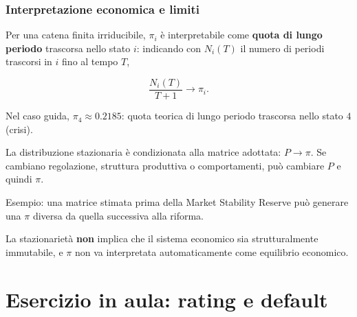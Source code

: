 \begin{frame}%
%

\frametitle{Interpretazione economica e limiti}%
%

%


Per una catena finita irriducibile, $\pi_{i}$ \`{e} interpretabile come
\textbf{quota di lungo periodo} trascorsa nello stato $i$: indicando con
$N_{i}(T)$ il numero di periodi trascorsi in $i$ fino al tempo $T$,%

\[
\frac{N_{i}(T)}{T+1} \longrightarrow\pi_{i}.
\]


Nel caso guida, $\pi_{4}\approx0.2185$: quota teorica di lungo periodo
trascorsa nello stato $4$ (crisi).

\medskip

\begin{stepitemize}
\item La distribuzione stazionaria \`{e} condizionata alla matrice adottata:
$P\longrightarrow\pi$. Se cambiano regolazione, struttura produttiva o
comportamenti, pu\`{o} cambiare $P$ e quindi $\pi$.

\item Esempio: una matrice stimata prima della Market Stability Reserve
pu\`{o} generare una $\pi$ diversa da quella successiva alla riforma.

\item La stazionariet\`{a} \textbf{non} implica che il sistema economico sia
strutturalmente immutabile, e $\pi$ non va interpretata automaticamente come
equilibrio economico.
\end{stepitemize}

%

\transboxout
\end{frame}%




\section{Esercizio in aula: rating e default}


